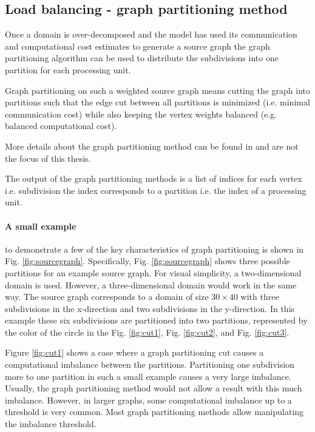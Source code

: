 \subsection{Load balancing - graph partitioning method}
Once a domain is over-decomposed and the model has used its communication and computational cost estimates to generate a source graph the graph partitioning algorithm can be used to distribute the subdivisions into one partition for each processing unit.

Graph partitioning on such a weighted source graph means cutting the graph into partitions such that the edge cut between all partitions is minimized (i.e. minimal communication cost) while also keeping the vertex weights balanced (e.g. balanced computational cost).

More details about the graph partitioning method can be found in \citet{karypis1998multilevel} and are not the focus of this thesis.

The output of the graph partitioning methods is a list of indices for each vertex i.e. subdivision the index corresponds to a partition i.e. the index of a processing unit.

\paragraph{A small example}to demonstrate a few of the key characteristics of graph partitioning is shown in Fig. \ref{fig:sourcegraph}.
Specifically, Fig. \ref{fig:sourcegraph} shows three possible partitions for an example source graph.
For visual simplicity, a two-dimensional domain is used.
However, a three-dimensional domain would work in the same way.
The source graph corresponds to a domain of size $30 \times 40$ with three subdivisions in the x-direction and two subdivisions in the y-direction.
In this example these six subdivisions are partitioned into two partitions, represented by the color of the circle in the Fig. \ref{fig:cut1}, Fig. \ref{fig:cut2}, and Fig. \ref{fig:cut3}.

Figure \ref{fig:cut1} shows a case where a graph partitioning cut causes a computational imbalance between the partitions.
Partitioning one subdivision more to one partition in such a small example causes a very large imbalance.
Usually, the graph partitioning method would not allow a result with this much imbalance.
However, in larger graphs, some computational imbalance up to a threshold is very common.
Most graph partitioning methods allow manipulating the imbalance threshold.

